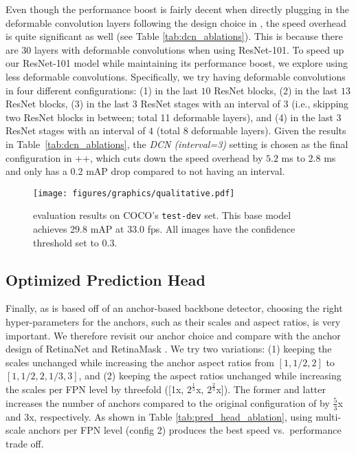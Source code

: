 \documentclass[10pt,journal,compsoc]{IEEEtran}
\begin{document}
Even though the performance boost is fairly decent when directly plugging in the deformable convolution layers following the design choice in \cite{deformv2}, the speed overhead is quite significant as well (see Table \ref{tab:dcn_ablations}). This is because there are 30 layers with deformable convolutions when using ResNet-101. To speed up our ResNet-101 model while maintaining its performance boost, we explore using less deformable convolutions.  Specifically, we try having deformable convolutions in four different configurations: (1) in the last $10$ ResNet blocks, (2) in the last $13$ ResNet blocks, (3) in the last 3 ResNet stages with an interval of $3$ (i.e., skipping two ResNet blocks in between; total 11 deformable layers), and (4) in the last 3 ResNet stages with an interval of $4$ (total 8 deformable layers).  Given the results in Table~\ref{tab:dcn_ablations}, the \textit{DCN (interval=3)} setting is chosen as the final configuration in \methodname++, which cuts down the speed overhead by $5.2$ ms to $2.8$ ms and only has a $0.2$ mAP drop compared to not having an interval.







    \begin{figure*}
    \centering
    \texttt{[image: figures/graphics/qualitative.pdf]}
\caption{\textbf{\methodname} evaluation results on COCO's \texttt{test-dev} set. This base model achieves 29.8 mAP at 33.0 fps. All images have the confidence threshold set to 0.3.} \label{fig:qualitative}
\end{figure*}     
\subsection{Optimized Prediction Head}
Finally, as \methodname{} is based off of an anchor-based backbone detector, choosing the right hyper-parameters for the anchors, such as their scales and aspect ratios, is very important. We therefore revisit our anchor choice and compare with the anchor design of RetinaNet \cite{retinanet} and RetinaMask \cite{fu-retinamask2019}. We try two variations: (1) keeping the scales unchanged while increasing the anchor aspect ratios from $[1, 1/2, 2]$ to $[1, 1/2, 2, 1/3, 3]$, and (2) keeping the aspect ratios unchanged while increasing the scales per FPN level by threefold ([1x, $2^{\frac{1}{3}}$x, $2^{\frac{2}{3}}$x]). The former and latter increases the number of anchors compared to the original configuration of \methodname{} by $\frac{5}{3}$x and 3x, respectively. As shown in Table \ref{tab:pred_head_ablation}, using multi-scale anchors per FPN level (config 2) produces the best speed vs.~performance trade off.
\end{document}

